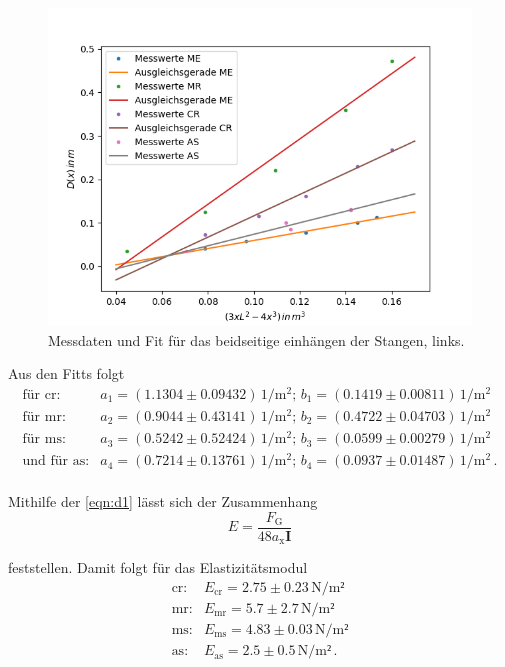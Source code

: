 \begin{figure}[H]
	\centering
	\includegraphics{Daten/AS2_l.png}
	\caption{Messdaten und Fit für das beidseitige einhängen der Stangen, links.}
	\label{fig:links}
\end{figure}

\noindent
Aus den Fitts folgt
\begin{align*}
    \text{für cr}:& a_1 = (1.1304 \pm 0.09432) \, \si{1\per\meter^2} ; \, b_1 = (0.1419 \pm 0.00811) \, \si{1\per\meter^2}  \\
    \text{für mr}:& a_2 = (0.9044 \pm 0.43141) \, \si{1\per\meter^2} ; \, b_2 = (0.4722 \pm 0.04703) \, \si{1\per\meter^2} \\
    \text{für ms}:& a_3 = (0.5242 \pm 0.52424) \, \si{1\per\meter^2} ; \, b_3 = (0.0599 \pm 0.00279) \, \si{1\per\meter^2}\\
\text{und für as}:& a_4 = (0.7214 \pm 0.13761) \, \si{1\per\meter^2} ;\,  b_4 = (0.0937 \pm 0.01487) \, \si{1\per\meter^2} \, .\\
\end{align*} 

\noindent
Mithilfe der \autoref{eqn:d1} lässt sich der Zusammenhang 
\begin{equation*}
    E = \frac{F_\text{G}}{48a_\text{x}\symbf{I}}
\end{equation*}

\noindent
feststellen. Damit folgt für das Elastizitätsmodul%
\begin{align*}
    \text{cr}:& E_\text{cr} = 2.75 \pm 0.23    \, \si{\newton\per\meter²}\\
    \text{mr}:& E_\text{mr} = 5.7 \pm 2.7 \, \si{\newton\per\meter²}\\
    \text{ms}:& E_\text{ms} = 4.83 \pm 0.03 \, \si{\newton\per\meter²} \\
    \text{as}:& E_\text{as} = 2.5\pm 0.5  \, \si{\newton\per\meter²} \, .\\
\end{align*} 

